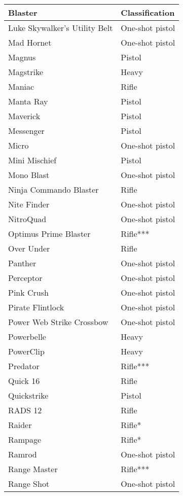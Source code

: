 \documentclass{scrbook}
\begin{document}
\begin{table}
\begin{tabular}{|l|l|} \hline 
Blaster & Classification \\
 \hline Luke Skywalker's Utility Belt & One-shot pistol \\
 \hline Mad Hornet & One-shot pistol \\
 \hline Magnus & Pistol \\
 \hline Magstrike & Heavy \\
 \hline Maniac & Rifle \\
 \hline Manta Ray & Pistol \\
 \hline Maverick & Pistol \\
 \hline Messenger & Pistol \\
 \hline Micro & One-shot pistol \\
 \hline Mini Mischief & Pistol \\
 \hline Mono Blast & One-shot pistol \\
 \hline Ninja Commando Blaster & Rifle \\
 \hline Nite Finder & One-shot pistol \\
 \hline NitroQuad & One-shot pistol \\
 \hline Optimus Prime Blaster & Rifle*** \\
 \hline Over Under & Rifle \\
 \hline Panther & One-shot pistol \\
 \hline Perceptor & One-shot pistol \\
 \hline Pink Crush & One-shot pistol \\
 \hline Pirate Flintlock & One-shot pistol \\
 \hline Power Web Strike Crossbow & One-shot pistol \\
 \hline Powerbelle & Heavy \\
 \hline PowerClip & Heavy \\
 \hline Predator & Rifle*** \\
 \hline Quick 16 & Rifle \\
 \hline Quickstrike & Pistol \\
 \hline RADS 12 & Rifle \\
 \hline Raider & Rifle* \\
 \hline Rampage & Rifle* \\
 \hline Ramrod & One-shot pistol \\
 \hline Range Master & Rifle*** \\
 \hline Range Shot & One-shot pistol \\

\end{tabular}
\end{table}
\end{document}
